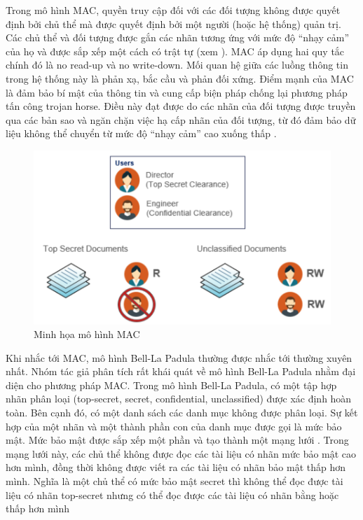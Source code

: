 Trong mô hình MAC, quyền truy cập đối với các đối tượng không được quyết
định bởi chủ thể mà được quyết định bởi một người (hoặc hệ thống) quản trị. Các chủ
thể và đối tượng được gắn các nhãn tương ứng với mức độ “nhạy cảm” của họ và được
sắp xếp một cách có trật tự (xem ). MAC áp dụng hai quy tắc chính đó là
no read-up và no write-down. Mối quan hệ giữa các luồng thông tin trong hệ thống này
là phản xạ, bắc cầu và phản đối xứng. Điểm mạnh của MAC là đảm bảo bí mật của thông
tin và cung cấp biện pháp chống lại phương pháp tấn công trojan horse. Điều này đạt
được do các nhãn của đối tượng được truyền qua các bản sao và ngăn chặn việc hạ cấp
nhãn của đối tượng, từ đó đảm bảo dữ liệu không thể chuyển từ mức độ “nhạy cảm” cao
xuống thấp \cite{nyanchama1996modeling}. 
\begin{figure}
    \centering
    \includegraphics[scale=0.5]{graphics/chapter-2/chap2-mac.png}
    \caption{Minh họa mô hình MAC}
    \label{fig:chap2-mac}
\end{figure}
\indent Khi nhắc tới MAC, mô hình Bell-La Padula \cite{bell1973secure} thường được nhắc tới thường xuyên nhất. Nhóm tác giả phân tích rất khái quát về mô hình Bell-La Padula nhằm đại
diện cho phương pháp MAC. Trong mô hình Bell-La Padula, có một tập hợp nhãn phân loại (top-secret, secret,
confidential, unclassified) được xác định hoàn toàn. Bên cạnh đó, có một danh sách các
danh mục không được phân loại. Sự kết hợp của một nhãn và một thành phần con của
danh mục được gọi là mức bảo mật. Mức bảo mật được sắp xếp một phần và tạo thành
một mạng lưới \cite{osborn1997mandatory}. Trong mạng lưới này, các chủ thể không được đọc các tài liệu có nhãn mức bảo
mật cao hơn mình, đồng thời không được viết ra các tài liệu có nhãn bảo mật thấp hơn
mình. Nghĩa là một chủ thể có mức bảo mật secret thì không thể đọc được tài liệu có
nhãn top-secret nhưng có thể đọc được các tài liệu có nhãn bằng hoặc thấp hơn mình
